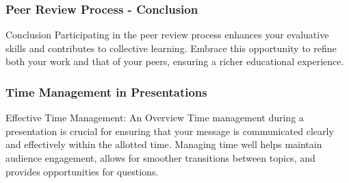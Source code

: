 \documentclass[aspectratio=169]{beamer}
\begin{document}
\begin{frame}[fragile]
    \frametitle{Peer Review Process - Conclusion}
    \begin{block}{Conclusion}
        Participating in the peer review process enhances your evaluative skills and contributes to collective learning. Embrace this opportunity to refine both your work and that of your peers, ensuring a richer educational experience.
    \end{block}
\end{frame}

\begin{frame}[fragile]
    \frametitle{Time Management in Presentations}
    \begin{block}{Effective Time Management: An Overview}
        Time management during a presentation is crucial for ensuring that your message is communicated clearly and effectively within the allotted time.
        Managing time well helps maintain audience engagement, allows for smoother transitions between topics, and provides opportunities for questions.
    \end{block}
\end{frame}
\end{document}
